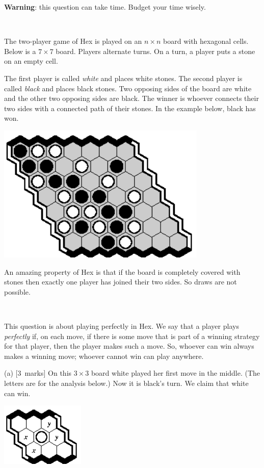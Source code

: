 \documentclass[12pt]{article}
\newcommand{\mymarks}[1]{\mbox{\small [#1 marks]}}
\begin{document}
{\bf Warning}: this question can take time. 
Budget your time wisely.

~

The two-player game of Hex is played on an $n \times n$ 
board with hexagonal cells. Below is a $7 \times 7$ board. 
Players alternate turns. 
On a turn, a player puts a stone on an empty cell.

The first player is called {\em white} and places white stones. 
The second player is called {\em black} and places black stones. 
Two opposing sides of the board are white and the other two 
opposing sides are black.
The winner is whoever connects
their two sides with a connected path of their stones. 
In the example below, black has won.

\begin{center}
\includegraphics[width=100mm]{fz/pix/7x7-f1b6.eps}
\end{center}

An amazing property of Hex 
is that if the board is completely covered with stones then
exactly one player has joined their two sides. So draws are not possible.

~

This question is about playing perfectly in Hex.
We say that a player plays {\em perfectly} if,
on each move, if there is some move that is part
of a winning strategy for that player,
then the player makes such a move.
So, whoever can win always makes a winning move;
whoever cannot win can play anywhere.

\newpage

(a) \mymarks{3}
On this $3 \times 3$ board white played her first move 
in the middle. (The letters are for the analysis below.)
Now it is black's turn.
We claim that white can win.

\begin{center}
\includegraphics[width=40mm]{fz/pix/3x3-marked.eps}
\end{center}
\end{document}
